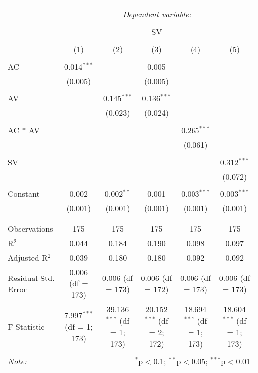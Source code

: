 
\begin{table}[!htbp] \centering 
  \caption{} 
  \label{} 
\begin{tabular}{@{\extracolsep{5pt}}lccccc} 
\\[-1.8ex]\hline 
\hline \\[-1.8ex] 
 & \multicolumn{5}{c}{\textit{Dependent variable:}} \\ 
\cline{2-6} 
\\[-1.8ex] & \multicolumn{5}{c}{SV} \\ 
\\[-1.8ex] & (1) & (2) & (3) & (4) & (5)\\ 
\hline \\[-1.8ex] 
 AC & 0.014$^{***}$ &  & 0.005 &  &  \\ 
  & (0.005) &  & (0.005) &  &  \\ 
  & & & & & \\ 
 AV &  & 0.145$^{***}$ & 0.136$^{***}$ &  &  \\ 
  &  & (0.023) & (0.024) &  &  \\ 
  & & & & & \\ 
 AC * AV &  &  &  & 0.265$^{***}$ &  \\ 
  &  &  &  & (0.061) &  \\ 
  & & & & & \\ 
 SV &  &  &  &  & 0.312$^{***}$ \\ 
  &  &  &  &  & (0.072) \\ 
  & & & & & \\ 
 Constant & 0.002 & 0.002$^{**}$ & 0.001 & 0.003$^{***}$ & 0.003$^{***}$ \\ 
  & (0.001) & (0.001) & (0.001) & (0.001) & (0.001) \\ 
  & & & & & \\ 
\hline \\[-1.8ex] 
Observations & 175 & 175 & 175 & 175 & 175 \\ 
R$^{2}$ & 0.044 & 0.184 & 0.190 & 0.098 & 0.097 \\ 
Adjusted R$^{2}$ & 0.039 & 0.180 & 0.180 & 0.092 & 0.092 \\ 
Residual Std. Error & 0.006 (df = 173) & 0.006 (df = 173) & 0.006 (df = 172) & 0.006 (df = 173) & 0.006 (df = 173) \\ 
F Statistic & 7.997$^{***}$ (df = 1; 173) & 39.136$^{***}$ (df = 1; 173) & 20.152$^{***}$ (df = 2; 172) & 18.694$^{***}$ (df = 1; 173) & 18.604$^{***}$ (df = 1; 173) \\ 
\hline 
\hline \\[-1.8ex] 
\textit{Note:}  & \multicolumn{5}{r}{$^{*}$p$<$0.1; $^{**}$p$<$0.05; $^{***}$p$<$0.01} \\ 
\end{tabular} 
\end{table} 
